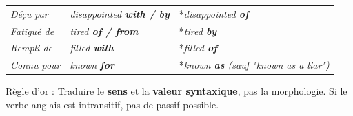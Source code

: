 \documentclass[11pt]{article}
\newcommand{\cle}[1]{{\popxbold\color{popdark}#1}}
\newcommand{\eng}[1]{\ifmmode\text{\textit{#1}}\else\begingroup\selectlanguage{english}\itshape #1\endgroup\fi}
\providecommand{\fr}[1]{\textit{#1}}
\begin{document}
\begin{attention}
\begin{enumerate}
\begin{center}
\begin{tabular}{|l|l|l|}
    \fr{Déçu par} & \eng{disappointed \textbf{with / by}} & *\eng{disappointed \textbf{of}} \\
    \fr{Fatigué de} & \eng{tired \textbf{of / from}} & *\eng{tired \textbf{by}} \\
    \fr{Rempli de} & \eng{filled \textbf{with}} & *\eng{filled \textbf{of}} \\
    \fr{Connu pour} & \eng{known \textbf{for}} & *\eng{known \textbf{as}} (sauf "known as a liar") \\
    \hline
    \end{tabular}
    \end{center}
\end{enumerate}
\cle{Règle d'or :} Traduire le \textbf{sens} et la \textbf{valeur syntaxique}, pas la morphologie. Si le verbe anglais est intransitif, pas de passif possible.
\end{attention}
\end{document}
